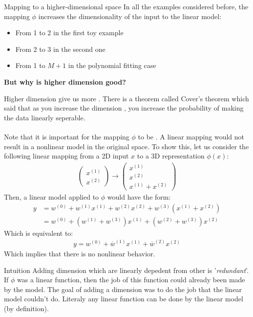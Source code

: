 \begin{parag}{Mapping to a higher-dimensional space}
    In all the examples considered before, the mapping $\phi$ increases the dimensionality of the input to the linear model:
	\begin{itemize}
	    \item From 1 to 2 in the first toy example
	    \item From 2 to 3 in the second one
	    \item From 1 to $M + 1$ in the polynomial fitting case
	\end{itemize}
	
	\begin{center}
	\textbf{But why is higher dimension good?}	
	\end{center}
	Higher dimension give us more . There is a theorem called Cover's theorem which said that as you increase the dimension , you increase the probability of making the data linearly seperable.\\
	$ $\\
	Note that it is important for the mapping $\phi$ to be . A linear mapping would not result in a nonlinear model in the original space. To show this, let us consider the following linear mapping from a 2D input $x$ to a 3D representation $\phi\left(x\right)$:
	\begin{align*} 
		\begin{pmatrix} x^{\left(1\right)} \\ x^{\left(2\right)} \end{pmatrix}  \to \begin{pmatrix} x^{\left(1\right)} \\ x^{\left(2\right)} \\ x^{\left(1\right)} + x^{\left(2\right)} \end{pmatrix} 
	\end{align*}
	Then, a linear model applied to $\phi$ would have the form:
	\begin{align*} 
		y &=  w^{\left(0\right)} + w^{\left(1\right)}x^{\left(1\right)} + w^{\left(2\right)}x^{\left(2\right)} + w^{\left(3\right)}\left(x^{\left(1\right)} + x^{\left(2\right)}\right)\\
		  &= w^{\left(0\right)} + \left(w^{\left(1\right)} + w^{\left(3\right)}\right)x^{\left(1\right)} + \left(w^{\left(2\right)} + w^{\left(3\right)}\right)x^{\left(2\right)}
	\end{align*}
	Which is equivalent to:
	\begin{align*} 
		y = w^{\left(0\right)} + \overline{w}^{\left(1\right)}x^{\left(1\right)} + \overline{w}^{\left(2\right)}x^{\left(2\right)}
	\end{align*}
	Which implies that there is no nonlinear behavior.
	\begin{subparag}{Intuition}
		Adding dimension which are linearly depedent from other is '\textit{redundant}'. If $\phi$ was a linear function, then the job of this function could already been made by the model. The goal of adding a dimension was to do the job that the linear model couldn't do. Literaly any linear function can be done by the linear model (by definition).
	\end{subparag}
	

\end{parag}

